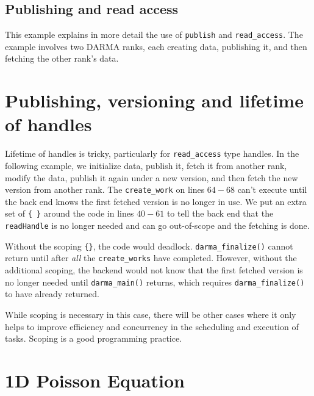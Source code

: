 \subsection{Publishing and read access}

This example explains in more detail the use of \texttt{publish} 
and \texttt{read\_access}. The example involves two DARMA ranks, each creating 
data, publishing it, and then fetching the other rank's data.








\section{Publishing, versioning and lifetime of handles}

Lifetime of handles is tricky, particularly for \texttt{read\_access} type handles.  
In the following example, we initialize data, publish it, fetch it from another rank, 
modify the data, publish it again under a new version, and then fetch the new version from another rank. 
The \texttt{create\_work} on lines $64-68$ can't execute until the back end knows the first fetched version is no longer in use.
We put an extra set of \texttt{\{ \}} around the code in lines $40-61$ to tell the back end that 
the \texttt{readHandle} is no longer needed and can go out-of-scope and the fetching is done.

Without the scoping \texttt{\{\}}, the code would deadlock.
\texttt{darma\_finalize()} cannot return until after {\it all} the \texttt{create\_works} have completed.
However, without the additional scoping, the backend would not know that the first fetched version is no longer needed until \texttt{darma\_main()} returns, which requires \texttt{darma\_finalize()} to have already returned.

While scoping is necessary in this case, there will be other cases where it only helps to improve efficiency and concurrency 
in the scheduling and execution of tasks. Scoping is a good programming practice.










\section{1D Poisson Equation}

